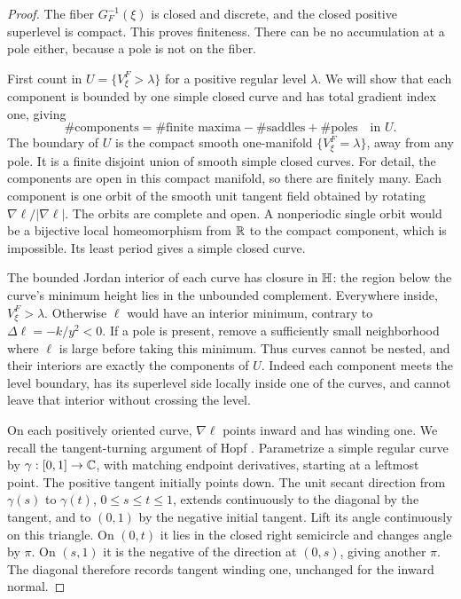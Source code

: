 \begin{proof}
The fiber \(G_F^{-1}(\xi)\) is closed and discrete, and the closed
positive superlevel is compact. This proves finiteness. There can
be no accumulation at a pole either, because a pole is not on the fiber.

First count in \(U=\{V_\xi^F>\lambda\}\) for a positive regular
level \(\lambda\). We will show that each component is bounded by
one simple closed curve and has total gradient index one, giving
\begin{equation}\label{eq:index-count}
 \#\text{components}
 =\#\text{finite maxima}-\#\text{saddles}+\#\text{poles}
 \quad\text{in }U.
\end{equation}
The boundary of \(U\) is the compact smooth one-manifold
\(\{V_\xi^F=\lambda\}\), away from any pole.
It is a finite disjoint union of smooth simple closed curves.
For detail, the components are open in this compact manifold, so
there are finitely many. Each component is one orbit of the smooth
unit tangent field obtained by rotating \(\nabla\ell/|\nabla\ell|\).
The orbits are complete and open. A nonperiodic single orbit would
be a bijective local homeomorphism from \(\mathbb R\) to the compact
component, which is impossible. Its least period gives a simple
closed curve.

The bounded Jordan interior of each curve has closure in \(\mathbb H\):
the region below the curve's minimum height lies in the unbounded
complement. Everywhere inside, \(V_\xi^F>\lambda\). Otherwise
\(\ell\) would have an interior minimum, contrary to
\(\Delta\ell=-k/y^2<0\). If a pole is present, remove a sufficiently
small neighborhood where \(\ell\) is large before taking this minimum.
Thus curves cannot be nested, and their interiors are exactly the
components of \(U\). Indeed each component meets the level boundary,
has its superlevel side locally inside one of the curves, and cannot
leave that interior without crossing the level.

On each positively oriented curve, \(\nabla\ell\) points inward
and has winding one. We recall the tangent-turning argument
of Hopf \cite[Section 2]{Hopf}.
Parametrize a simple regular curve by \(\gamma:[0,1]\to\mathbb C\),
with matching endpoint derivatives, starting at a leftmost point.
The positive tangent initially points down. The unit secant direction
from \(\gamma(s)\) to \(\gamma(t)\), \(0\le s\le t\le1\),
extends continuously to the diagonal by the tangent, and to
\((0,1)\) by the negative initial tangent.
Lift its angle continuously on this triangle.
On \((0,t)\) it lies in the closed right semicircle and changes
angle by \(\pi\). On \((s,1)\) it is the negative of the direction
at \((0,s)\), giving another \(\pi\).
The diagonal therefore records tangent winding one, unchanged for
the inward normal.


\end{proof}

